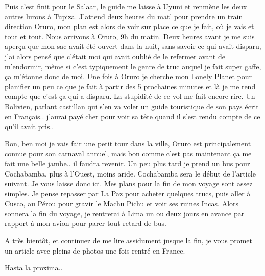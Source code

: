 \begin{multicols}{2}

Puis c'est finit pour le Salaar, le guide me laisse à Uyuni et renmène les deux autres lurons à Tupiza. J'attend deux heures du mat' pour prendre un train direction Oruro, mon plan est alors de voir sur place ce que je fait, où je vais et tout et tout. Nous arrivons à Oruro, 9h du matin. Deux heures avant je me suis aperçu que mon sac avait été ouvert dans la nuit, sans savoir ce qui avait disparu, j'ai alors pensé que c'était moi qui avait oublié de le refermer avant de m'endormir, même si c'est typiquement le genre de truc auquel je fait super gaffe, ça m'étonne donc de moi. Une fois à Oruro je cherche mon Lonely Planet pour planifier un peu ce que je fait à partir des 5 prochaines minutes et là je me rend compte que c'est ça qui a disparu. La stupidité de ce vol me fait encore rire. Un Bolivien, parlant castillan qui s'en va voler un guide touristique de son pays écrit en Français.. j'aurai payé cher pour voir sa tête quand il s'est rendu compte de ce qu'il avait pris..

Bon, ben moi je vais fair une petit tour dans la ville, Oruro est principalement connue pour son carnaval annuel, mais bon comme c'est pas maintenant ça me fait une belle jambe.. il faudra revenir. Un peu plus tard je prend un bus pour Cochabamba, plus à l'Ouest, moins aride. Cochabamba sera le début de l'article suivant. Je vous laisse donc ici. Mes plans pour la fin de mon voyage sont assez simples. Je pense repasser par La Paz pour acheter quelques trucs, puis aller à Cusco, au Pérou pour gravir le Machu Pichu et voir ses ruines Incas. Alors sonnera la fin du voyage, je rentrerai à Lima un ou deux jours en avance par rapport à mon avion pour parer tout retard de bus.

A très bientôt, et continuez de me lire assidument jusque la fin, je vous promet un article avec pleins de photos une fois rentré en France.

Hasta la proxima..

\end{multicols}


